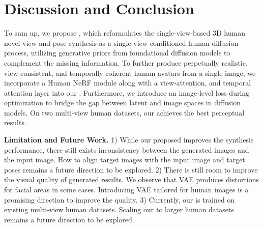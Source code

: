 \section{Discussion and Conclusion}
To sum up, we propose \nickname{}, which reformulates the single-view-based 3D human novel view and pose synthesis as a single-view-conditioned human diffusion process, utilizing generative priors from foundational diffusion models to complement the missing information. 
To further produce perpetually realistic, view-consistent, and temporally coherent human avatars from a single image, we incorporate a Human NeRF module along with a view-attention, and temporal attention layer into our \nickname{}.
Furthermore, we introduce an image-level loss during optimization to bridge the gap between latent and image spaces in diffusion models.
On two multi-view human datasets, our \nickname{} achieves the best perceptual results. 

\noindent \textbf{Limitation and Future Work.}
1) While our proposed \nickname{} improves the synthesis performance, there still exists inconsistency between the generated images and the input image. 
How to align target images with the input image and target poses remains a future direction to be explored.
2) There is still room to improve the visual quality of generated results. 
We observe that VAE produces distortions for facial areas in some cases. 
Introducing VAE tailored for human images is a promising direction to improve the quality.
3) Currently, our \nickname{} is trained on existing multi-view human datasets. 
Scaling our \nickname{} to larger human datasets remains a future direction to be explored.

